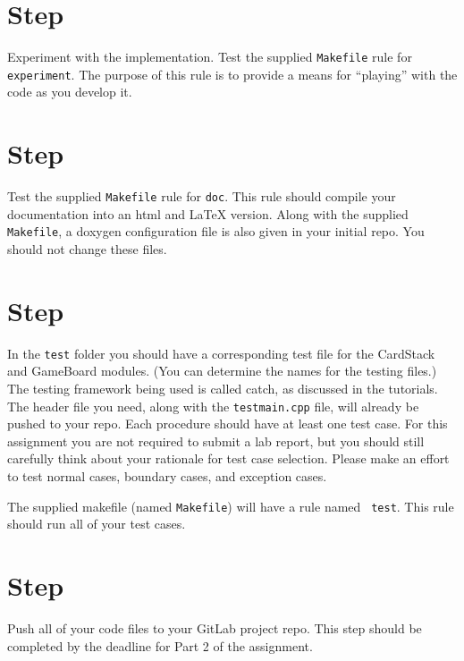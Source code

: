 \documentclass[12pt]{article}
\newcounter{stepnum}
\begin{document}
\section *{Step  \thestepnum}

Experiment with the implementation.  Test the supplied \texttt{Makefile} rule
for {\tt experiment}.  The purpose of this rule is to provide a means for
``playing'' with the code as you develop it.

\section *{Step  \thestepnum}

Test the supplied \texttt{Makefile} rule for {\tt doc}.  This rule should
compile your documentation into an html and \LaTeX{} version.  Along with the
supplied \texttt{Makefile}, a doxygen configuration file is also given in your
initial repo.  You should not change these files.

\section *{Step  \thestepnum}

In the \texttt{test} folder you should have a corresponding test file for the
CardStack and GameBoard modules.  (You can determine the names
for the testing files.)  The testing framework being used is called catch, as
discussed in the tutorials.  The header file you need, along with the
\texttt{testmain.cpp} file, will already be pushed to your repo.  Each procedure
should have at least one test case.  For this assignment you are not required to
submit a lab report, but you should still carefully think about your rationale
for test case selection.  Please make an effort to test normal cases, boundary
cases, and exception cases.

The supplied makefile (named {\tt Makefile}) will have a rule named {\tt
  test}.  This rule should run all of your test cases.

\section *{Step  \thestepnum}

Push all of your code files to your GitLab project repo.  This step should be
completed by the deadline for Part 2 of the assignment.
\end{document}
